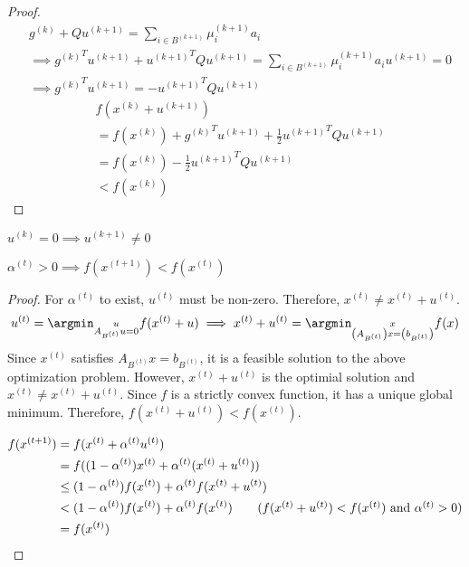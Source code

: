 \begin{proof}
\begin{align*}
& g^{(k)} + Qu^{(k+1)} = \sum_{i \in B^{(k+1)}} \mu_i^{(k+1)}a_i
\\ &\implies {g^{(k)}}^Tu^{(k+1)} + {u^{(k+1)}}^TQu^{(k+1)} = \sum_{i \in B^{(k+1)}} \mu_i^{(k+1)}a_iu^{(k+1)} = 0
\\ &\implies {g^{(k)}}^Tu^{(k+1)} = - {u^{(k+1)}}^TQu^{(k+1)}
\end{align*}
\begin{align*}
& f(x^{(k)} + u^{(k+1)})
\\ &= f(x^{(k)}) + {g^{(k)}}^Tu^{(k+1)} + \frac{1}{2}{u^{(k+1)}}^TQu^{(k+1)} \tag{Taylor series}
\\ &= f(x^{(k)}) - \frac{1}{2}{u^{(k+1)}}^TQu^{(k+1)}
\\ &< f(x^{(k)}) \tag{$Q$ is PD}
\end{align*}
\end{proof}

\begin{corollary}
$u^{(k)} = 0 \implies u^{(k+1)} \neq 0$
\end{corollary}

\begin{lemma}
$\alpha^{(t)} > 0 \implies f(x^{(t+1)}) < f(x^{(t)})$
\end{lemma}
\begin{proof}
For $\alpha^{(t)}$ to exist, $u^{(t)}$ must be non-zero.
Therefore, $x^{(t)} \neq x^{(t)} + u^{(t)}$.
\[ u^{(t)} = \argmin_{\substack{u \\ A_{B^{(t)}}u = 0}} f(x^{(t)} + u)
\\ \implies x^{(t)} + u^{(t)} = \argmin_{\substack{x \\ \left(A_{B^{(t)}}\right)x = \left(b_{B^{(t)}}\right)}} f(x) \]
Since $x^{(t)}$ satisfies $A_{B^{(t)}}x = b_{B^{(t)}}$,
it is a feasible solution to the above optimization problem.
However, $x^{(t)} + u^{(t)}$ is the optimial solution and $x^{(t)} \neq x^{(t)} + u^{(t)}$.
Since $f$ is a strictly convex function, it has a unique global minimum.
Therefore, $f(x^{(t)} + u^{(t)}) < f(x^{(t)})$.

\begin{align*}
f(x^{(t+1)}) &= f(x^{(t)} + \alpha^{(t)}u^{(t)})
\\ &= f((1-\alpha^{(t)})x^{(t)} + \alpha^{(t)}(x^{(t)} + u^{(t)}))
\\ &\le (1-\alpha^{(t)})f(x^{(t)}) + \alpha^{(t)}f(x^{(t)} + u^{(t)})
\\ &< (1-\alpha^{(t)})f(x^{(t)}) + \alpha^{(t)}f(x^{(t)})
\tag{$f(x^{(t)} + u^{(t)}) < f(x^{(t)})$ and $\alpha^{(t)} > 0$}
\\ &= f(x^{(t)})
\end{align*}
\end{proof}

